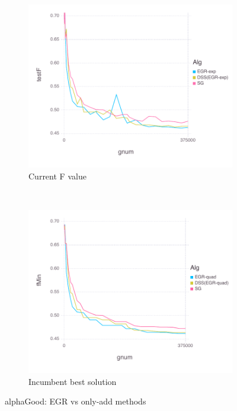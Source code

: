 \documentclass[11pt]{article}
\begin{document}
   \begin{figure}[H]
       \centering
       \begin{subfigure}[b]{0.45\textwidth}
           \includegraphics[width=\textwidth]{Figures/alphaGoodBLtrueFfFinal-dss.pdf}
           \caption{Current F value}
       \end{subfigure}
       ~ %
         \begin{subfigure}[b]{0.45\textwidth}
             \includegraphics[width=\textwidth]{Figures/alphaGoodBLtrueFminfFinal-dss.pdf}
             \caption{Incumbent best solution}
         \end{subfigure}
       \caption{alphaGood: EGR vs only-add methods}\label{fig:alphaGoodoa}
   \end{figure}
   
\end{document}
